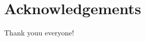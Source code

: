 \documentclass[12pt,openany,english]{jsbook}
\begin{document}
%
%
%
\chapter{Acknowledgements}
%
%
%
\begin{doublespace}
%
%
%
Thank youu everyone!
%
%
%
\end{doublespace}
%
%
%
\end{document}
